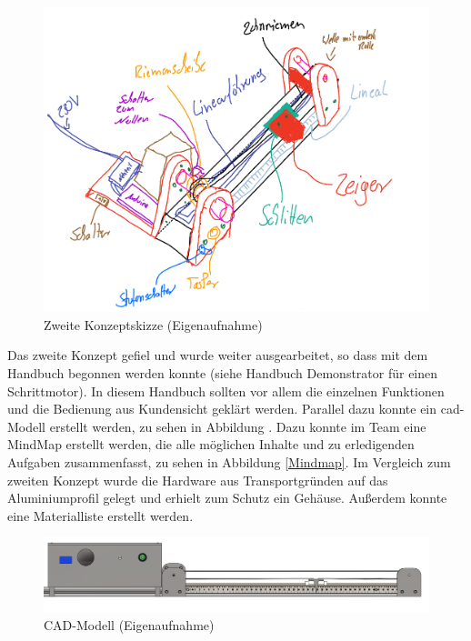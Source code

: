 \begin{figure}[H]
	\begin{center}
		\includegraphics[width=\textwidth]{Images/Konzeptskizze2.png}
		\caption{Zweite Konzeptskizze (Eigenaufnahme)} \label{ZweiteKonzeptskizze}
	\end{center}
\end{figure}

Das zweite Konzept gefiel und wurde weiter ausgearbeitet, so dass mit dem Handbuch begonnen werden konnte (siehe Handbuch Demonstrator für einen Schrittmotor). In diesem Handbuch sollten vor allem die einzelnen Funktionen und die Bedienung aus Kundensicht geklärt werden. Parallel dazu konnte ein \ac{cad}-Modell erstellt werden, zu sehen in Abbildung . Dazu konnte im Team eine MindMap erstellt werden, die alle möglichen Inhalte und zu erledigenden Aufgaben zusammenfasst, zu sehen in Abbildung \ref{Mindmap}. Im Vergleich zum zweiten Konzept wurde die Hardware aus Transportgründen auf das Aluminiumprofil gelegt und erhielt zum Schutz ein Gehäuse. Außerdem konnte eine Materialliste erstellt werden.

\begin{figure}[H]
	\begin{center}
		\includegraphics[width=\textwidth]{Images/Konstruktion1.png}
		\caption{CAD-Modell (Eigenaufnahme)} \label{CADMOD}
	\end{center}
\end{figure} 

